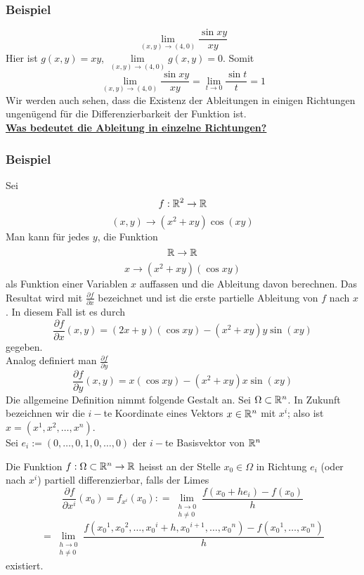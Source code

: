 \subsubsection*{Beispiel}
\[\mathop {\lim }\limits_{(x,y) \to (4,0)} \frac{{\sin xy}}{{xy}}\] Hier ist $g(x,y)=xy$, $\mathop {\lim }\limits_{(x,y) \to (4,0)} g(x,y) = 0$. Somit \[\mathop {\lim }\limits_{(x,y) \to (4,0)} \frac{{\sin xy}}{{xy}} = \mathop {\lim }\limits_{t \to 0} \frac{{\sin t}}{t} = 1\] Wir werden auch sehen, dass die Existenz der Ableitungen in einigen Richtungen ungenügend für die Differenzierbarkeit der Funktion ist. \\

\noindent\textbf{\underline{Was bedeutet die Ableitung in einzelne Richtungen?}}
\subsubsection*{Beispiel}
Sei \[f:\mathbb{R}^2\to \mathbb{R}\]\[(x,y)\to \left(x^2+xy\right)\cos(xy)\]Man kann für jedes $y$, die Funktion \[\mathbb{R}\to\mathbb{R}\]\[x\to \left( x^2+xy\right)\left(\cos xy\right)\]als Funktion einer Variablen $x$ auffassen und die Ableitung davon berechnen. Das Resultat wird mit $\frac{\partial f}{\partial x}$ bezeichnet und ist die erste partielle Ableitung von $f$ nach $x$. In diesem Fall ist es durch \[\frac{{\partial f}}{{\partial x}}(x,y) = (2x + y)(\cos xy) - ({x^2} + xy)y\sin (xy)\] gegeben. \\

\noindent Analog definiert man $\frac{\partial f}{\partial y}$
\[\frac{{\partial f}}{{\partial y}}(x,y) = x(\cos xy) - ({x^2} + xy)x\sin (xy)\]
Die allgemeine Definition nimmt folgende Gestalt an. Sei $\Omega \subset\mathbb{R}^n$. In Zukunft  bezeichnen wir die $i-$te Koordinate eines Vektors $x\in\mathbb{R}^n$ mit $x^i$; also ist $x=\left( x^1,x^2,\dots,x^n\right)$.\\

\noindent Sei $e_i:=\left( 0,\dots,0,1,0,\dots,0\right)$ der $i-$te Basisvektor von $\mathbb{R}^n$

\begin{definition}{8.2}
Die Funktion $f:\Omega\subset\mathbb{R}^n\to\mathbb{R}$ heisst an der Stelle $x_0\in\Omega$ in Richtung $e_i$ (oder nach $x^i$) partiell differenzierbar, falls der Limes \[\frac{{\partial f}}{{\partial {x^i}}}({x_0}) = {f_{{x^i}}}({x_0}): =  \lim_{\substack{h \to 0 \\ h\not = 0}}{\frac{{f({x_0} + h{e_i}) - f({x_0})}}{h}} \]
\[ = \lim_{\substack{h \to 0 \\ h\not = 0}}{\frac{{f\left( {{x_0}^1,{x_0}^2, \ldots ,{x_0}^i + h,{x_0}^{i + 1}, \ldots ,{x_0}^n} \right) - f\left( {{x_0}^1, \ldots ,{x_0}^n} \right)}}{h}}\]
existiert.
\end{definition}
